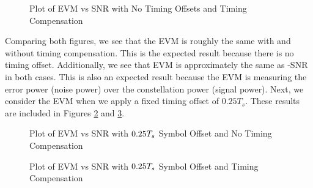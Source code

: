 \documentclass{article}
\begin{document}
\begin{figure}[H]
	\centerline{}
	\caption{Plot of EVM vs SNR with No Timing Offsets and Timing Compensation}
	\label{fig::evm_no_timing_offset}
\end{figure}

Comparing both figures, we see that the EVM is roughly the same with and without timing compensation. This is the expected result because there is no timing offset. Additionally, we see that EVM is approximately the same as -SNR in both cases. This is also an expected result because the EVM is measuring the error power (noise power) over the constellation power (signal power). Next, we consider the EVM when we apply a fixed timing offset of $0.25T_s$. These results are included in Figures \ref{fig::evm_0p25_symbol_offset_no_comp} and \ref{fig::evm_0p25_symbol_offset}.

\begin{figure}[H]
	\centerline{}
	\caption{Plot of EVM vs SNR with $\protect{0.25T_s}$ Symbol Offset and No Timing Compensation}
	\label{fig::evm_0p25_symbol_offset_no_comp}
\end{figure}

\begin{figure}[H]
	\centerline{}
	\caption{Plot of EVM vs SNR with $\protect{0.25T_s}$ Symbol Offset and Timing Compensation}
	\label{fig::evm_0p25_symbol_offset}
\end{figure}
\end{document}
